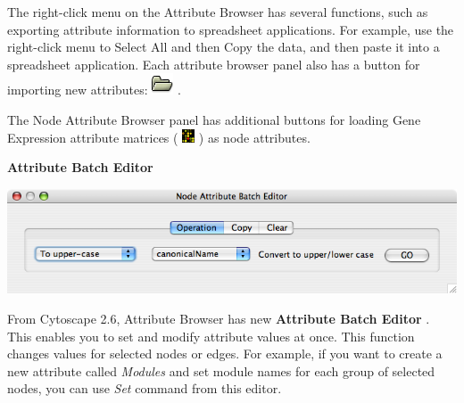  The right-click menu on the Attribute Browser has several functions, such as exporting attribute information to spreadsheet applications. For example, use the right-click menu to Select All and then Copy the data, and then paste it into a spreadsheet application. Each attribute browser panel also has a button for importing new attributes: \includegraphics[scale=1]{images/attributes_import_icon.png}  . 


 The Node Attribute Browser panel has additional buttons for loading Gene Expression attribute matrices ( \includegraphics[width=1em]{images/attributes_gene_expr_icon.png}  ) as node attributes. 


 \textbf{Attribute Batch Editor}


 \includegraphics[width=\textwidth]{images/attribute_editor26.png} 


 From Cytoscape 2.6, Attribute Browser has new \textbf{Attribute Batch Editor}
. This enables you to set and modify attribute values at once. This function changes values for selected nodes or edges. For example, if you want to create a new attribute called \emph{Modules}
 and set module names for each group of selected nodes, you can use \emph{Set}
 command from this editor. 

